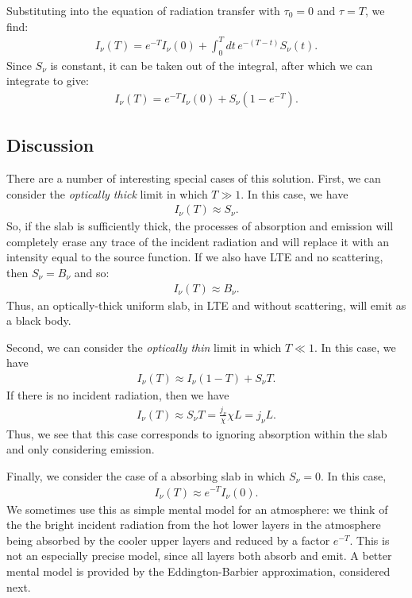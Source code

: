 Substituting into the equation of radiation transfer with $\tau_0 = 0$ and $\tau = T$, we find:
\begin{align}
I_\nu(T) = e^{-T} I_\nu(0) + \int_{0}^{T}\!\!dt\,e^{-(T-t)}S_\nu(t).
\end{align}
Since $S_\nu$ is constant, it can be taken out of the integral, after which we can integrate to give:
\begin{align}
I_\nu(T) = e^{-T} I_\nu(0) + S_\nu (1-e^{-T}).
\end{align}

\newslide

\subsection{Discussion}

There are a number of interesting special cases of this solution. First, we can consider the \emph{optically thick} limit in which $T\gg1$. In this case, we have
\begin{align}
I_\nu(T) \approx S_\nu.
\end{align}
So, if the slab is sufficiently thick, the processes of absorption and emission will completely erase any trace of the incident radiation and will replace it with an intensity equal to the source function. If we also have LTE and no scattering, then $S_\nu = B_\nu$ and so:
\begin{align}
I_\nu(T) \approx B_\nu.
\end{align}
Thus, an optically-thick uniform slab, in LTE and without scattering, will emit as a black body.

Second, we can consider the \emph{optically thin} limit in which $T\ll1$. In this case, we have
\begin{align}
I_\nu(T) \approx I_\nu (1- T) + S_\nu T.
\end{align}
If there is no incident radiation, then we have
\begin{align}
I_\nu(T) \approx S_\nu T = \frac{j_\nu}{\chi} \chi L = j_\nu L.
\end{align}
Thus, we see that this case corresponds to ignoring absorption within the slab and only considering emission.

Finally, we consider the case of a absorbing slab in which $S_\nu = 0$. In this case, 
\begin{align}
I_\nu(T) \approx e^{-T} I_\nu(0).
\end{align}
We sometimes use this as simple mental model for an atmosphere: we think of the the bright incident radiation from the hot lower layers in the atmosphere being absorbed by the cooler upper layers and reduced by a factor $e^{-T}$. This is not an especially precise model, since all layers both absorb and emit. A better mental model is provided by the Eddington-Barbier approximation, considered next.

